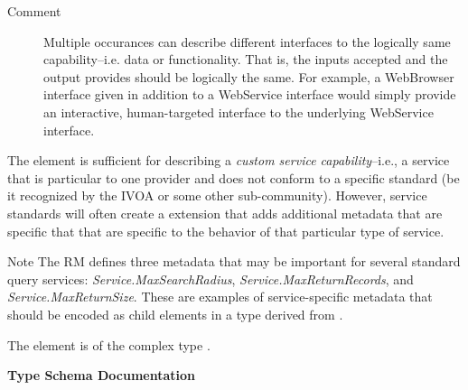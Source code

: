 \documentclass[11pt,a4paper]{ivoa}
\begin{document}
\begin{bigdescription}
\begin{description}
\item[Comment] 
                  Multiple occurances can describe different interfaces to 
                  the logically same capability--i.e. data or functionality.
                  That is, the inputs accepted and the output provides should
                  be logically the same.  For example, a WebBrowser interface
                  given in addition to a WebService interface would simply 
                  provide an interactive, human-targeted interface to the 
                  underlying WebService interface.  
               

\end{description}


\end{bigdescription}\endgroup

\endgroup


The  element is sufficient for describing a
\emph{custom service capability}--i.e., a service that is
particular to one provider and does not conform to a specific standard 
(be it recognized by the IVOA or some other sub-community).  However,
service standards will often create a 
extension that adds additional metadata that are specific that that
are specific to the behavior of that particular type of service.  



\begin{admonition}{Note}
The RM defines three metadata that may be
important for several standard query services:
\emph{Service.MaxSearchRadius},
\emph{Service.MaxReturnRecords}, and
\emph{Service.MaxReturnSize}.  These are examples of
service-specific metadata that should be encoded as child
elements in a type derived from .  
\end{admonition}


The  element is of the complex type 
.


\begingroup
      	\renewcommand*\descriptionlabel[1]{%
      	\hbox to 5.5em{\emph{#1}\hfil}}\vspace{2ex}\noindent\textbf{ Type Schema Documentation}


\end{document}
